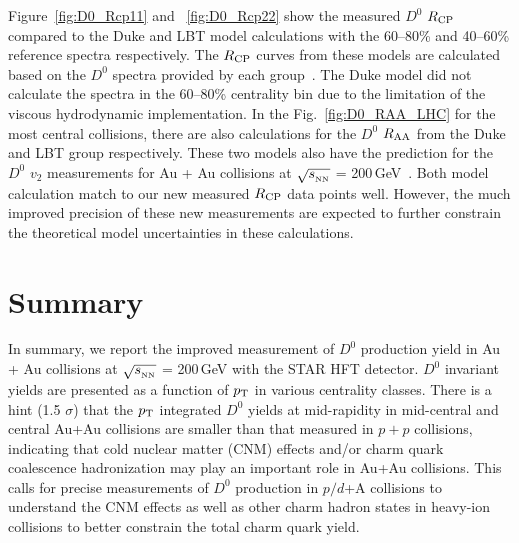 \documentclass[%
 reprint,	
 amsmath,amssymb,
 aps,
 prc,
]{revtex4-1}
\begin{document}
Figure~\ref{fig:D0_Rcp11} and ~\ref{fig:D0_Rcp22} show the measured $D^0$ $R_{\rm CP}$ compared to the Duke and LBT model calculations with the 60--80\% and 40--60\% reference spectra respectively. The $R_{\rm CP}$ curves from these models are calculated based on the $D^0$ spectra provided by each group~\cite{Cao:2016gvr,LBT:private,Xu:2017obm}. The Duke model did not calculate the spectra in the 60--80\% centrality bin due to the limitation of the viscous hydrodynamic implementation. In the Fig.~\ref{fig:D0_RAA_LHC} for the most central collisions, there are also calculations for the $D^0$ $R_{\rm AA}$ from the Duke and LBT group respectively. These two models also have the prediction for the $D^0$ $v_2$ measurements for Au + Au collisions at $\sqrt{s_{_{\rm NN}}}$ = 200\,GeV~\cite{Star_D_v2}. %
Both model calculation match to our new measured $R_{\rm CP}$ data points well. However, the much improved precision of these new measurements are expected to further constrain the theoretical model uncertainties in these calculations.


\section{\label{summary}Summary}

In summary, we report the improved measurement of $D^0$ production yield in Au + Au collisions at $\sqrt{s_{_{\rm NN}}}$ = 200\,GeV with the STAR HFT detector. $D^0$ invariant yields are presented as a function of $p_{\rm T}$ in various centrality classes. There is a hint (1.5 $\sigma$) that the $p_{\rm T}$ integrated $D^0$ yields at mid-rapidity in mid-central and central Au+Au collisions are smaller than that measured in $p+p$ collisions, indicating that cold nuclear matter (CNM) effects and/or charm quark coalescence hadronization may play an important role in Au+Au collisions. This calls for precise measurements of $D^0$ production in $p/d$+A collisions to understand the CNM effects as well as other charm hadron states in heavy-ion collisions to better constrain the total charm quark yield.
\end{document}
